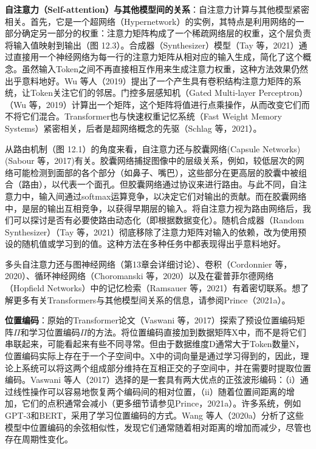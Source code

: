 \textbf{自注意力（Self-attention）与其他模型间的关系}：自注意力计算与其他模型紧密相关。首先，它是一个超网络（Hypernetwork）的实例，其特点是利用网络的一部分确定另一部分的权重：注意力矩阵构成了一个稀疏网络层的权重，这个层负责将输入值映射到输出（图 12.3）。合成器（Synthesizer）模型（Tay 等，2021）通过直接用一个神经网络为每一行的注意力矩阵从相对应的输入生成，简化了这个概念。虽然输入Token之间不再直接相互作用来生成注意力权重，这种方法效果仍然出乎意料地好。Wu 等人（2019）提出了一个产生具有卷积结构注意力矩阵的系统，让Token关注它们的邻居。门控多层感知机（Gated Multi-layer Perceptron）（Wu 等，2019）计算出一个矩阵，这个矩阵将值进行点乘操作，从而改变它们而不将它们混合。Transformer也与快速权重记忆系统（Fast Weight Memory Systems）紧密相关，后者是超网络概念的先驱（Schlag 等，2021）。

从路由机制（图 12.1）的角度来看，自注意力还与胶囊网络(Capsule Networks)
(Sabour 等，2017)有关。胶囊网络捕捉图像中的层级关系，例如，较低层次的网络可能检测到面部的各个部分（如鼻子、嘴巴），这些部分在更高层的胶囊中被组合（路由），以代表一个面孔。但胶囊网络通过协议来进行路由。与此不同，自注意力中，输入间通过softmax运算竞争，以决定它们对输出的贡献。而在胶囊网络中，是层的输出互相竞争，以获得早期层的输入。将自注意力视为路由网络后，我们可以探讨是否有必要使路由动态化（即根据数据变化）。随机合成器（Random Synthesizer）（Tay 等，2021）彻底移除了注意力矩阵对输入的依赖，改为使用预设的随机值或学习到的值。这种方法在多种任务中都表现得出乎意料地好。

多头自注意力还与图神经网络（第13章会详细讨论）、卷积（Cordonnier 等，2020）、循环神经网络（Choromanski 等，2020）以及在霍普菲尔德网络（Hopfield Networks）中的记忆检索（Ramsauer 等，2021）有着密切联系。想了解更多有关Transformers与其他模型间关系的信息，请参阅Prince（2021a）。

\textbf{位置编码}：原始的Transformer论文（Vaswani 等，2017）探索了预设位置编码矩阵\(\Pi\)和学习位置编码\(\Pi\)的方法。将位置编码直接加到数据矩阵X中，而不是将它们串联起来，可能看起来有些不同寻常。但由于数据维度D通常大于Token数量N，位置编码实际上存在于一个子空间中。X中的词向量是通过学习得到的，因此，理论上系统可以将这两个组成部分维持在互相正交的子空间中，并在需要时提取位置编码。Vaswani 等人（2017）选择的是一套具有两大优点的正弦波形编码：（i）通过线性操作可以容易地恢复两个编码间的相对位置，（ii）随着位置间距离的增加，它们的点积通常会减小（更多细节请参见Prince，2021a）。许多系统，例如GPT-3和BERT，采用了学习位置编码的方式。Wang 等人（2020a）分析了这些模型中位置编码的余弦相似性，发现它们通常随着相对距离的增加而减少，尽管也存在周期性变化。

